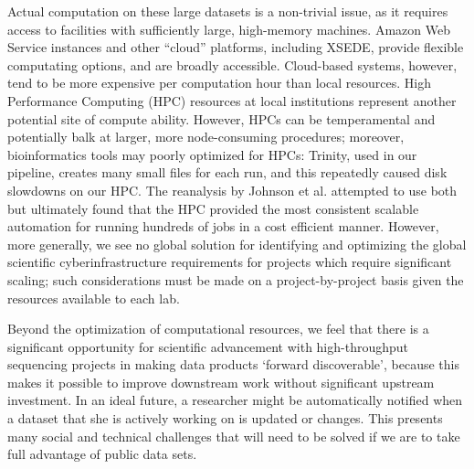 \documentclass[12pt]{article}
\begin{document}
Actual computation on these large datasets is a non-trivial issue, as
it requires access to facilities with sufficiently large, high-memory
machines.  Amazon Web Service instances and other ``cloud'' platforms,
including XSEDE, provide flexible computating options, and are broadly
accessible. Cloud-based systems, however, tend to be more expensive
per computation hour than local resources. High Performance Computing
(HPC) resources at local institutions represent another potential site
of compute ability.  However, HPCs can be temperamental and
potentially balk at larger, more node-consuming procedures; moreover,
bioinformatics tools may poorly optimized for HPCs: Trinity, used in
our pipeline, creates many small files for each run, and this
repeatedly caused disk slowdowns on our HPC.  The reanalysis by
Johnson et al. \cite{Johnson2018} attempted to use both but ultimately
found that the HPC provided the most consistent scalable automation
for running hundreds of jobs in a cost efficient manner.  However,
more generally, we see no global solution for identifying and
optimizing the global scientific cyberinfrastructure requirements for
projects which require significant scaling; such considerations must
be made on a project-by-project basis given the resources available to
each lab.

Beyond the optimization of computational resources, we feel that there
is a significant opportunity for scientific advancement with
high-throughput sequencing projects in making data products `forward
discoverable', because this makes it possible to improve downstream
work without significant upstream investment.  In an ideal future, a
researcher might be automatically notified when a dataset that she is
actively working on is updated or changes. This presents many social
and technical challenges that will need to be solved if we are to take
full advantage of public data sets.
\end{document}
